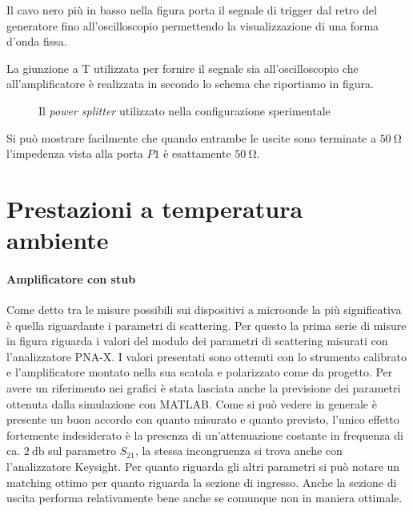 \documentclass[12pt,oneside]{book}
\begin{document}
Il cavo nero più in basso nella figura porta il segnale di trigger dal retro del generatore fino all'oscilloscopio permettendo la visualizzazione di una forma d'onda fissa.

La giunzione a T utilizzata per fornire il segnale sia all'oscilloscopio che all'amplificatore è realizzata in secondo lo schema che riportiamo in figura.

\begin{figure}[!htbp]
    \centering
        
        \caption{Il \textit{power splitter} utilizzato nella configurazione sperimentale}
        \label{splitter_50}
\end{figure}

Si può mostrare facilmente che quando entrambe le uscite sono terminate a $\SI{50}{\ohm}$ l'impedenza vista alla porta $P1$ è esattamente $\SI{50}{\ohm}$.



\section{Prestazioni a temperatura ambiente}

\paragraph{Amplificatore con stub}

Come detto tra le misure possibili sui dispositivi a microonde la più significativa è quella riguardante i parametri di scattering. Per questo la prima serie di misure in figura riguarda i valori del modulo dei parametri di scattering misurati con l'analizzatore PNA-X. I valori presentati sono ottenuti con lo strumento calibrato e l'amplificatore montato nella sua scatola e polarizzato come da progetto. Per avere un riferimento nei grafici è stata lasciata anche la previsione dei parametri ottenuta dalla simulazione con MATLAB. Come si può vedere in generale è presente un buon accordo con quanto misurato e quanto previsto, l'unico effetto fortemente indesiderato è la presenza di un'attenuazione costante in frequenza di ca. $\SI{2}{\decibel}$ sul parametro $S_{21}$, la stessa incongruenza si trova anche con l'analizzatore Keysight. Per quanto riguarda gli altri parametri si può notare un matching ottimo per quanto riguarda la sezione di ingresso. Anche la sezione di uscita performa relativamente bene anche se comunque non in maniera ottimale.
\end{document}
